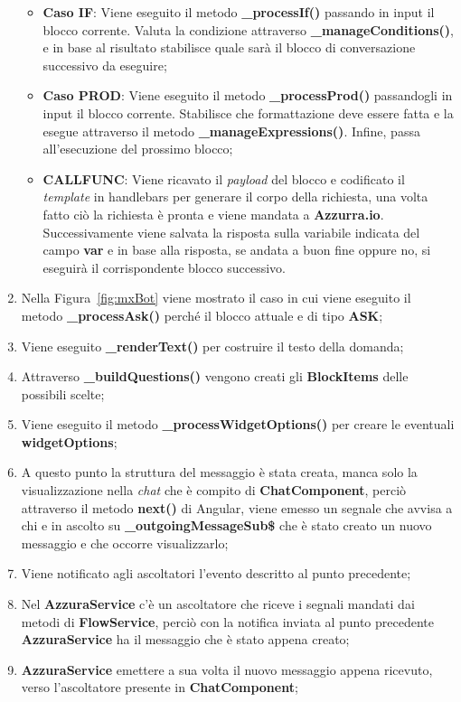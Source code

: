 \begin{enumerate}
\begin{itemize}
		\item \textbf{Caso IF}: Viene eseguito il metodo \textbf{\_processIf()} passando in input il blocco corrente. Valuta la condizione attraverso \textbf{\_manageConditions()}, e in base al risultato stabilisce quale sarà il blocco di conversazione successivo da eseguire;
		\item \textbf{Caso PROD}: Viene eseguito il metodo \textbf{\_processProd()} passandogli in input il blocco corrente. Stabilisce che formattazione deve essere fatta e la esegue attraverso il metodo \textbf{\_manageExpressions()}. Infine, passa all'esecuzione del prossimo blocco;
		\item \textbf{CALLFUNC}: Viene ricavato il \emph{payload} del blocco e codificato il \emph{template} in handlebars per generare il corpo della richiesta, una volta fatto ciò la richiesta è pronta e viene mandata a \textbf{Azzurra.io}. Successivamente viene salvata la risposta sulla variabile indicata del campo \textbf{var} e in base alla risposta, se andata a buon fine oppure no, si eseguirà il corrispondente blocco successivo.
	\end{itemize}	
	\item Nella Figura~\ref{fig:mxBot} viene mostrato il caso in cui viene eseguito il metodo \textbf{\_processAsk()} perché il blocco attuale e di tipo \textbf{ASK};
	\item Viene eseguito \textbf{\_renderText()} per costruire il testo della domanda;
	\item Attraverso \textbf{\_buildQuestions()} vengono creati gli \textbf{BlockItems} delle possibili scelte;
	\item Viene eseguito il metodo \textbf{\_processWidgetOptions()} per creare le eventuali \textbf{widgetOptions};
	\item A questo punto la struttura del messaggio è stata creata, manca solo la visualizzazione nella \emph{chat} che è compito di \textbf{ChatComponent}, perciò attraverso il metodo \textbf{next()} di Angular, viene emesso un segnale che avvisa a chi e in ascolto su \textbf{\_outgoingMessageSub\$} che è stato creato un nuovo messaggio e che occorre visualizzarlo;
	\item Viene notificato agli ascoltatori l'evento descritto al punto precedente;
	\item Nel \textbf{AzzuraService} c'è un ascoltatore che riceve i segnali mandati dai metodi di \textbf{FlowService}, perciò con la notifica inviata al punto precedente \textbf{AzzuraService} ha il messaggio che è stato appena creato;
	\item \textbf{AzzuraService} emettere a sua volta il nuovo messaggio appena ricevuto, verso l'ascoltatore presente in \textbf{ChatComponent};

\end{enumerate}
